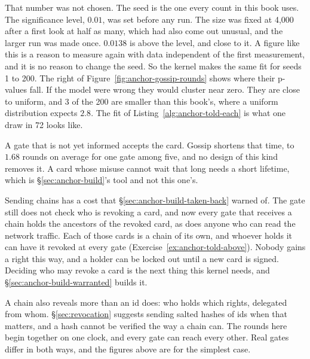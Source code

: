That number was not chosen. The seed is the one every count in this book
uses. The significance level, $0.01$, was set before any run. The size was
fixed at 4{,}000 after a first look at half as many, which had also come out
unusual, and the larger run was made once. $0.0138$ is above the level, and
close to it. A figure like this is a reason to measure again with data
independent of the first measurement, and it is no reason to change the
seed. So the kernel
makes the same fit for seeds 1 to 200. The right of
Figure~\ref{fig:anchor-gossip-rounds} shows where their p-values fall. If
the model were wrong they would cluster near zero. They are close to
uniform, and 3 of the 200 are smaller than this book's, where a uniform
distribution expects $2.8$.
The fit of Listing~\ref{alg:anchor-told-each} is what one draw in 72
looks like.

\begin{pdboundary}
\setlength{\parskip}{4pt plus 1pt}
A gate that is not yet informed accepts the card. Gossip shortens that
time, to $1.68$ rounds on average for one gate among five, and no design
of this kind removes it. A card whose misuse cannot wait that long needs a
short lifetime, which is \S\ref{sec:anchor-build}'s tool and not this one's.

Sending chains has a cost that \S\ref{sec:anchor-build-taken-back}
warned of. The gate still does not check who is revoking a card, and now
every gate that receives a chain holds the ancestors of the revoked card,
as does anyone who can read the network traffic. Each of those cards is a
chain of its own, and whoever holds it can have it revoked at every gate
(Exercise~\ref{ex:anchor-told-above}). Nobody gains a right this way, and
a holder can be locked out until a new card is signed. Deciding who may
revoke a card is the next thing this kernel needs, and
\S\ref{sec:anchor-build-warranted} builds it.

A chain also reveals more than an id does: who holds which rights,
delegated from whom. \S\ref{sec:revocation} suggests sending salted hashes
of ids when that matters, and a hash cannot be verified the way a chain
can. The rounds here begin together on one clock, and every gate can reach
every other. Real gates differ in both ways, and the figures above are for
the simplest case.
\end{pdboundary}
